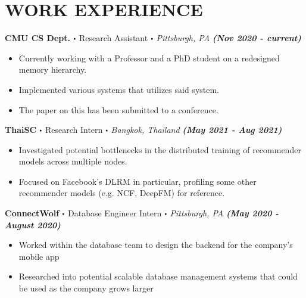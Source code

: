 \documentclass[10pt]{article}
\newcommand\sbullet[1][.5]{\mathbin{\vcenter{\hbox{\scalebox{#1}{$\bullet$}}}}}
\begin{document}
  \section*{\large \textcolor{lighterB} {WORK EXPERIENCE}}
  \vspace*{-0.23cm}

  \textbf{\large CMU CS Dept. $\sbullet$} {\large Research Assistant $\sbullet$ \textit{Pittsburgh, PA} \hfill \textit{\textbf{(Nov 2020 - current)}}}

  \vspace*{-0.2cm}
  \begin{itemize}
    \itemsep-0.4em
    \item \textcolor{lighterG}{Currently working with a Professor and a PhD student on a redesigned memory hierarchy.}
    \item \textcolor{lighterG}{Implemented various systems that utilizes said system.}
    \item \textcolor{lighterG}{The paper on this has been submitted to a conference.}
  \end{itemize}

  \textbf{\large ThaiSC $\sbullet$} {\large Research Intern $\sbullet$ \textit{Bangkok, Thailand} \hfill \textit{\textbf{(May 2021 - Aug 2021)}}}

  \vspace*{-0.2cm}
  \begin{itemize}
    \itemsep-0.4em
    \item \textcolor{lighterG}{Investigated potential bottlenecks in the distributed training of recommender models across multiple nodes.}
    \item \textcolor{lighterG}{Focused on Facebook's DLRM in particular, profiling some other recommender models (e.g. NCF, DeepFM) for reference.}
  \end{itemize}

  \textbf{\large ConnectWolf $\sbullet$} {\large Database Engineer Intern $\sbullet$ \textit{Pittsburgh, PA} \hfill \textit{\textbf{(May 2020 - August 2020)}}}

  \vspace*{-0.2cm}
  \begin{itemize}
    \itemsep-0.4em
    \item \textcolor{lighterG}{Worked within the database team to design the backend for the company's mobile app}
    \item \textcolor{lighterG}{Researched into potential scalable database management systems that could be used as the company grows larger}
  \end{itemize}
\end{document}
